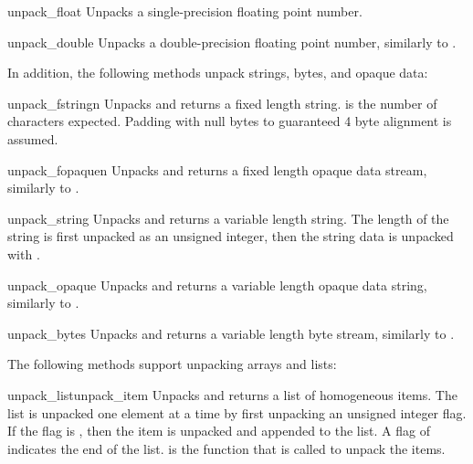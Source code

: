 \begin{methoddesc}[Unpacker]{unpack_float}{}
Unpacks a single-precision floating point number.
\end{methoddesc}

\begin{methoddesc}[Unpacker]{unpack_double}{}
Unpacks a double-precision floating point number, similarly to
.
\end{methoddesc}

In addition, the following methods unpack strings, bytes, and opaque
data:

\begin{methoddesc}[Unpacker]{unpack_fstring}{n}
Unpacks and returns a fixed length string.   is the number of
characters expected.  Padding with null bytes to guaranteed 4 byte
alignment is assumed.
\end{methoddesc}

\begin{methoddesc}[Unpacker]{unpack_fopaque}{n}
Unpacks and returns a fixed length opaque data stream, similarly to
.
\end{methoddesc}

\begin{methoddesc}[Unpacker]{unpack_string}{}
Unpacks and returns a variable length string.  The length of the
string is first unpacked as an unsigned integer, then the string data
is unpacked with .
\end{methoddesc}

\begin{methoddesc}[Unpacker]{unpack_opaque}{}
Unpacks and returns a variable length opaque data string, similarly to
.
\end{methoddesc}

\begin{methoddesc}[Unpacker]{unpack_bytes}{}
Unpacks and returns a variable length byte stream, similarly to
.
\end{methoddesc}

The following methods support unpacking arrays and lists:

\begin{methoddesc}[Unpacker]{unpack_list}{unpack_item}
Unpacks and returns a list of homogeneous items.  The list is unpacked
one element at a time
by first unpacking an unsigned integer flag.  If the flag is ,
then the item is unpacked and appended to the list.  A flag of
 indicates the end of the list.   is the
function that is called to unpack the items.
\end{methoddesc}

